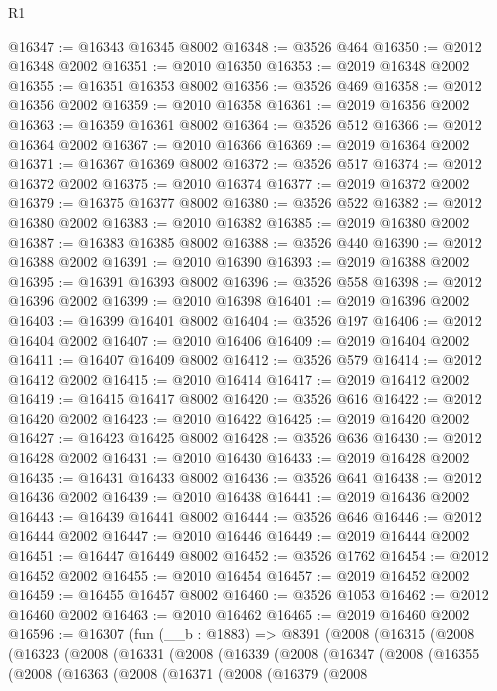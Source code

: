 \begin{lexlean}{R1}
\begin{coremodule}
@16347 := @16343 @16345 @8002
@16348 := @3526 @464
@16350 := @2012 @16348 @2002
@16351 := @2010 @16350
@16353 := @2019 @16348 @2002
@16355 := @16351 @16353 @8002
@16356 := @3526 @469
@16358 := @2012 @16356 @2002
@16359 := @2010 @16358
@16361 := @2019 @16356 @2002
@16363 := @16359 @16361 @8002
@16364 := @3526 @512
@16366 := @2012 @16364 @2002
@16367 := @2010 @16366
@16369 := @2019 @16364 @2002
@16371 := @16367 @16369 @8002
@16372 := @3526 @517
@16374 := @2012 @16372 @2002
@16375 := @2010 @16374
@16377 := @2019 @16372 @2002
@16379 := @16375 @16377 @8002
@16380 := @3526 @522
@16382 := @2012 @16380 @2002
@16383 := @2010 @16382
@16385 := @2019 @16380 @2002
@16387 := @16383 @16385 @8002
@16388 := @3526 @440
@16390 := @2012 @16388 @2002
@16391 := @2010 @16390
@16393 := @2019 @16388 @2002
@16395 := @16391 @16393 @8002
@16396 := @3526 @558
@16398 := @2012 @16396 @2002
@16399 := @2010 @16398
@16401 := @2019 @16396 @2002
@16403 := @16399 @16401 @8002
@16404 := @3526 @197
@16406 := @2012 @16404 @2002
@16407 := @2010 @16406
@16409 := @2019 @16404 @2002
@16411 := @16407 @16409 @8002
@16412 := @3526 @579
@16414 := @2012 @16412 @2002
@16415 := @2010 @16414
@16417 := @2019 @16412 @2002
@16419 := @16415 @16417 @8002
@16420 := @3526 @616
@16422 := @2012 @16420 @2002
@16423 := @2010 @16422
@16425 := @2019 @16420 @2002
@16427 := @16423 @16425 @8002
@16428 := @3526 @636
@16430 := @2012 @16428 @2002
@16431 := @2010 @16430
@16433 := @2019 @16428 @2002
@16435 := @16431 @16433 @8002
@16436 := @3526 @641
@16438 := @2012 @16436 @2002
@16439 := @2010 @16438
@16441 := @2019 @16436 @2002
@16443 := @16439 @16441 @8002
@16444 := @3526 @646
@16446 := @2012 @16444 @2002
@16447 := @2010 @16446
@16449 := @2019 @16444 @2002
@16451 := @16447 @16449 @8002
@16452 := @3526 @1762
@16454 := @2012 @16452 @2002
@16455 := @2010 @16454
@16457 := @2019 @16452 @2002
@16459 := @16455 @16457 @8002
@16460 := @3526 @1053
@16462 := @2012 @16460 @2002
@16463 := @2010 @16462
@16465 := @2019 @16460 @2002
@16596 := @16307
    (fun (__b : @1883) =>
    @8391
      (@2008
        (@16315
          (@2008
            (@16323
              (@2008
                (@16331
                  (@2008
                    (@16339
                      (@2008
                        (@16347
                          (@2008
                            (@16355
                              (@2008
                                (@16363
                                  (@2008
                                    (@16371
                                      (@2008
                                        (@16379
                                          (@2008

\end{coremodule}
\end{lexlean}
